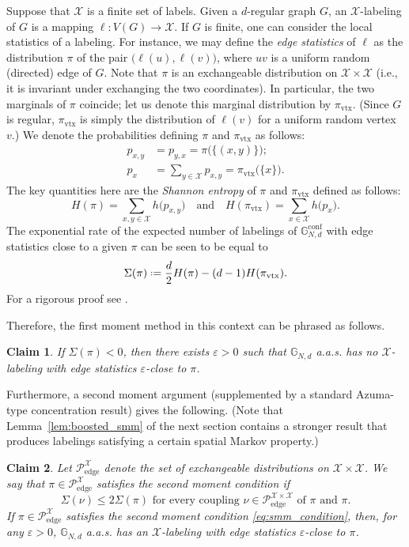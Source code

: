\documentclass[12pt]{amsart}
\newtheorem*{claim*}{Claim}
\theoremstyle{definition}
\newcommand\Gb{\mathbb{G}}
\newcommand\Gbconf{\mathbb{G}^{\textrm{conf}}}
\newcommand\Pcedge{\mathcal{P}_\mathrm{edge}}
\newcommand\Xc{\mathcal{X}}
\newcommand\eps{\varepsilon}
\newcommand\pivtx{\pi_\mathrm{vtx}}
\newcommand{\defeq}{\mathrel{\vcenter{\baselineskip0.5ex \lineskiplimit0pt
                     \hbox{\scriptsize.}\hbox{\scriptsize.}}}%
                     =}
\begin{document}
Suppose that $\Xc$ is a finite set of labels. Given a $d$-regular graph $G$, an $\Xc$-labeling of $G$ is a mapping $\ell \colon V(G) \to \Xc$. If $G$ is finite, one can consider the local statistics of a labeling. For instance, we may define the \emph{edge statistics} of $\ell$ as the distribution $\pi$ of the pair $\big( \ell(u), \ell(v) \big)$, where $uv$ is a uniform random (directed) edge of $G$. Note that 
$\pi$ is an exchangeable distribution on $\Xc \times \Xc$ (i.e., it is invariant under exchanging the two coordinates). In particular, the two marginals of $\pi$ coincide; let us denote this marginal distribution by $\pivtx$. (Since $G$ is regular, $\pivtx$ is simply the distribution of $\ell(v)$ for a uniform random vertex $v$.) We denote the probabilities defining $\pi$ and $\pivtx$ as follows:
%
\begin{align*}
p_{x,y} &=p_{y,x}=\pi\big( \{(x,y)\} \big) ;\\
p_x &= \sum_{y\in \Xc} p_{x,y} 
= \pivtx\big( \{x\} \big) .
\end{align*}
%
The key quantities here are the \emph{Shannon entropy} of $\pi$ and $\pivtx$ defined as follows:
%
\begin{equation} \label{eq:Sh_entr}
H(\pi) = \sum_{x,y \in \Xc} h\big( p_{x,y} \big) 
\quad \text{and} \quad
H(\pivtx) = \sum_{x \in \Xc} h\big( p_x \big) .
\end{equation}
%
The exponential rate of the expected number of labelings of $\Gbconf_{N,d}$ with edge statistics close to a given $\pi$ can be seen to be equal to 
%
\[ \Sigma(\pi) \defeq \frac{d}{2} H(\pi) - (d-1) H(\pivtx) .\]
%
For a rigorous proof see \cite[Lemma 4.1 and the proof of Theorem 4]{backhausz2018largegirth}.

Therefore, the first moment method in this context can be phrased as follows.
%
\begin{claim*}
If $\Sigma(\pi)<0$, then there exists $\eps>0$ such that $\Gb_{N,d}$ a.a.s. has no $\Xc$-labeling with edge statistics $\eps$-close to $\pi$.
\end{claim*}
%

Furthermore, a second moment argument (supplemented by a standard Azuma-type concentration result) gives the following. %
(Note that Lemma~\ref{lem:boosted_smm} of the next section contains a stronger result that produces labelings satisfying a certain spatial Markov property.)
%
\begin{claim*} Let $\Pcedge^\Xc$ denote the set of exchangeable distributions on $\Xc \times \Xc$. We say that $\pi \in \Pcedge^\Xc$ satisfies the \emph{second moment condition} if 
%
\begin{equation} \label{eq:smm_condition}
\Sigma(\nu) \leq 2 \Sigma(\pi) 
\text{ for every coupling $\nu \in \Pcedge^{\Xc \times \Xc}$ of $\pi$ and $\pi$.}
\end{equation}
%
If $\pi \in \Pcedge^\Xc$ satisfies the second moment condition \eqref{eq:smm_condition}, then, for any $\eps>0$, $\Gb_{N,d}$ a.a.s. has an $\Xc$-labeling with edge statistics $\eps$-close to $\pi$.
\end{claim*}
%
\end{document}
